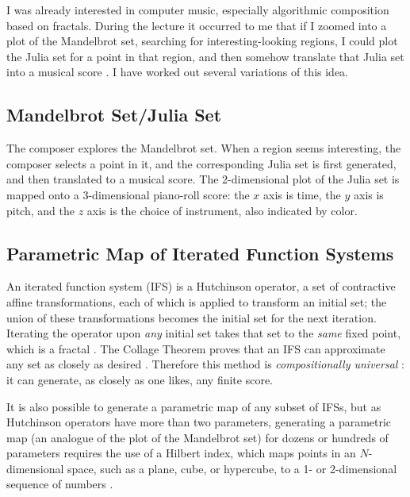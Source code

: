 \documentclass[]{interact}
\theoremstyle{plain}%
\theoremstyle{definition}
\theoremstyle{remark}
\begin{document}
I was already interested in computer music, especially algorithmic composition based on fractals. During the lecture it occurred to me that if I zoomed into a plot of the Mandelbrot set, searching for interesting-looking regions, I could plot the Julia set for a point in that region, and then somehow translate that Julia set into a musical score \citep{obsessed}. I have worked out several variations of this idea.

\subsection{Mandelbrot Set/Julia Set}

The composer explores the Mandelbrot set. When a region seems interesting, the composer selects a point in it, and the corresponding Julia set is first generated, and then translated to a musical score. The 2-dimensional plot of the Julia set is mapped onto a 3-dimensional piano-roll score: the $x$ axis is time, the $y$ axis is pitch, and the $z$ axis is the choice of instrument, also indicated by color.

\subsection{Parametric Map of Iterated Function Systems}

An iterated function system (IFS) is a Hutchinson operator, a set of contractive affine transformations, each of which is applied to transform an initial set; the union of these transformations becomes the initial set for the next iteration. Iterating the operator upon \emph{any} initial set takes that set to the \emph{same} fixed point, which is a fractal \citep{barnsley1985iterated, barnsley1993}. The Collage Theorem proves that an IFS can approximate any set as closely as desired \citep{barnsley1989fractal, barnsley1993}. Therefore this method is \emph{compositionally universal} \citep{obsessed, gogins2023scoregraphs}: it can generate, as closely as one likes, any finite score. 

It is also possible to generate a parametric map of any subset of IFSs, but as Hutchinson operators have more than two parameters, generating a parametric map (an analogue of the plot of the Mandelbrot set) for dozens or hundreds of parameters requires the use of a Hilbert index, which maps points in an $N$-dimensional space, such as a plane, cube, or hypercube, to a 1- or 2-dimensional sequence of numbers \citep{patrick1968mapping}. 
\end{document}

